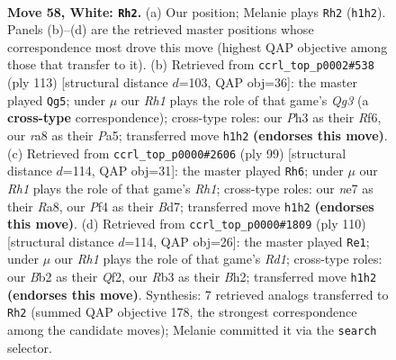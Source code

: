 \documentclass[11pt]{article}
\begin{document}
\clearpage

\begin{figure}[p]\centering
\begin{subfigure}{0.46\textwidth}\centering
\resizebox{\linewidth}{!}{%
\newchessgame
\chessboard[
  setfen={rn1qk2r/4n1b1/6p1/3p2P1/1N1P1P1p/1R5P/1BQ1B3/6KR w - - 5 58},
  showmover=false,
  pgfstyle=straightmove, color=movearrow, markmove={h1-h2}
]}
\caption{}
\end{subfigure}\hfill
\begin{subfigure}{0.46\textwidth}\centering
\resizebox{\linewidth}{!}{%
\newchessgame
\chessboard[
  setfen={8/7k/4prqp/p2p4/3Pnb2/P2N3R/1B3PP1/3Q2K1 b - - 14 57},
  showmover=false,
  pgfstyle=straightmove, color=movearrow, markmove={g6-g5}
]}
\caption{}
\end{subfigure}
\\[4pt]
\begin{subfigure}{0.46\textwidth}\centering
\resizebox{\linewidth}{!}{%
\newchessgame
\chessboard[
  setfen={r5kr/3bq1n1/4p3/3pP3/1N6/1P1B1NQP/1K4R1/8 b - - 4 50},
  showmover=false,
  pgfstyle=straightmove, color=movearrow, markmove={h8-h6}
]}
\caption{}
\end{subfigure}\hfill
\begin{subfigure}{0.46\textwidth}\centering
\resizebox{\linewidth}{!}{%
\newchessgame
\chessboard[
  setfen={7k/1p1bq1nr/3N1p2/2P2p2/p2P3P/P7/5Q1B/3R2K1 w - - 0 56},
  showmover=false,
  pgfstyle=straightmove, color=movearrow, markmove={d1-e1}
]}
\caption{}
\end{subfigure}
\caption{\textbf{Move 58, White: \texttt{Rh2}.} (a) Our position; Melanie plays \texttt{Rh2} (\texttt{h1h2}). Panels (b)--(d) are the retrieved master positions whose correspondence most drove this move (highest QAP objective among those that transfer to it). (b) Retrieved from \texttt{ccrl\_top\_p0002\#538} (ply 113) [structural distance $d$=103, QAP obj=36]: the master played \texttt{Qg5}; under $\mu$ our \emph{Rh1} plays the role of that game's \emph{Qg3} (a \textbf{cross-type} correspondence); cross-type roles: our \emph{P}h3 as their \emph{R}f6, our \emph{r}a8 as their \emph{P}a5; transferred move \texttt{h1h2} \textbf{(endorses this move)}. (c) Retrieved from \texttt{ccrl\_top\_p0000\#2606} (ply 99) [structural distance $d$=114, QAP obj=31]: the master played \texttt{Rh6}; under $\mu$ our \emph{Rh1} plays the role of that game's \emph{Rh1}; cross-type roles: our \emph{n}e7 as their \emph{R}a8, our \emph{P}f4 as their \emph{B}d7; transferred move \texttt{h1h2} \textbf{(endorses this move)}. (d) Retrieved from \texttt{ccrl\_top\_p0000\#1809} (ply 110) [structural distance $d$=114, QAP obj=26]: the master played \texttt{Re1}; under $\mu$ our \emph{Rh1} plays the role of that game's \emph{Rd1}; cross-type roles: our \emph{B}b2 as their \emph{Q}f2, our \emph{R}b3 as their \emph{B}h2; transferred move \texttt{h1h2} \textbf{(endorses this move)}. Synthesis: 7 retrieved analogs transferred to \texttt{Rh2} (summed QAP objective 178, the strongest correspondence among the candidate moves); Melanie committed it via the \texttt{search} selector.}
\label{fig:thought-m114}
\end{figure}
\end{document}
